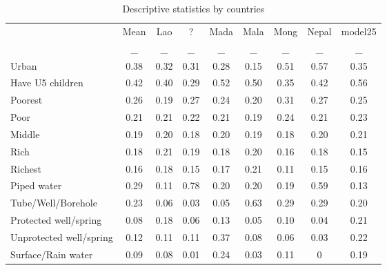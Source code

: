 \begin{table}[htbp]\centering
\def\sym#1{\ifmmode^{#1}\else\(^{#1}\)\fi}
\caption{Descriptive statistics by countries \label{Outside}}
\begin{tabular}{l*{8}{c}}
\hline\hline
                    &\multicolumn{1}{c}{Mean}&\multicolumn{1}{c}{Lao}&\multicolumn{1}{c}{?}&\multicolumn{1}{c}{Mada}&\multicolumn{1}{c}{Mala}&\multicolumn{1}{c}{Mong}&\multicolumn{1}{c}{Nepal}&\multicolumn{1}{c}{model25}\\
                    &           _&           _&           _&           _&           _&           _&           _&           _\\
\hline
Urban               &        0.38&        0.32&        0.31&        0.28&        0.15&        0.51&        0.57&        0.35\\
Have U5 children    &        0.42&        0.40&        0.29&        0.52&        0.50&        0.35&        0.42&        0.56\\
Poorest             &        0.26&        0.19&        0.27&        0.24&        0.20&        0.31&        0.27&        0.25\\
Poor                &        0.21&        0.21&        0.22&        0.21&        0.19&        0.24&        0.21&        0.23\\
Middle              &        0.19&        0.20&        0.18&        0.20&        0.19&        0.18&        0.20&        0.21\\
Rich                &        0.18&        0.21&        0.19&        0.18&        0.20&        0.16&        0.18&        0.15\\
Richest             &        0.16&        0.18&        0.15&        0.17&        0.21&        0.11&        0.15&        0.16\\
Piped water         &        0.29&        0.11&        0.78&        0.20&        0.20&        0.19&        0.59&        0.13\\
Tube/Well/Borehole  &        0.23&        0.06&        0.03&        0.05&        0.63&        0.29&        0.29&        0.20\\
Protected well/spring&        0.08&        0.18&        0.06&        0.13&        0.05&        0.10&        0.04&        0.21\\
Unprotected well/spring&        0.12&        0.11&        0.11&        0.37&        0.08&        0.06&        0.03&        0.22\\
Surface/Rain water  &        0.09&        0.08&        0.01&        0.24&        0.03&        0.11&        0&        0.19\\

\end{tabular}
\end{table}
